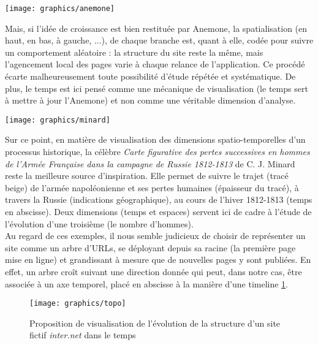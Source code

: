 \documentclass[symmetric,justified,marginals=raggedouter]{tufte-book}
\begin{document}
\begin{figure*}
  \texttt{[image: graphics/anemone]}
  \caption{Fonctionnement du système de visualisation Anemone, pour un site fictif \textit{inter.net}}
  \label{fig:anemone}
\end{figure*}

\noindent Mais, si l'idée de croissance est bien restituée par Anemone, la spatialisation (en haut, en bas, à gauche, ...), de chaque branche est, quant à elle, codée pour suivre un comportement aléatoire : la structure du site reste la même, mais l'agencement local des pages varie à chaque relance de l'application. Ce procédé écarte malheureusement toute possibilité d'étude répétée et systématique. De plus, le temps est ici pensé comme une mécanique de visualisation (le temps sert à mettre à jour l'Anemone) et non comme une véritable dimension d'analyse.

\begin{figure*}
  \texttt{[image: graphics/minard]}
  \caption{C.J. Minard, (1869), Carte figurative des pertes successives en hommes de l'Armée Française dans la campagne de Russie 1812-1813}
  \label{fig:minard}
\end{figure*}

\noindent Sur ce point, en matière de visualisation des dimensions spatio-tempo\-relles d'un processus historique, la célèbre \textit{Carte figurative des pertes successives en hommes de l'Armée Française dans la campagne de Russie 1812-1813} de C. J. Minard reste la meilleure source d'inspiration. Elle permet de suivre le trajet (tracé beige) de l'armée napoléonienne et ses pertes humaines (épaisseur du tracé), à travers la Russie (indications géographique), au cours de l'hiver 1812-1813 (temps en abscisse). Deux dimensions (temps et espaces) servent ici de cadre à l'étude de l'évolution d'une troisième (le nombre d'hommes). \\ 

\noindent Au regard de ces exemples, il nous semble judicieux de choisir de représenter un site comme un arbre d'URLs, se déployant depuis sa racine (la première page mise en ligne) et grandissant à mesure que de nouvelles pages y sont publiées. En effet, un arbre croît suivant une direction donnée qui peut, dans notre cas, être associée à un axe temporel, placé en abscisse à la manière d'une timeline \ref{fig:topo}. 

\begin{figure}
  \texttt{[image: graphics/topo]}
  \caption{Proposition de visualisation de l'évolution de la structure d'un site fictif \textit{inter.net} dans le temps}
  \label{fig:topo}
\end{figure}
\end{document}
